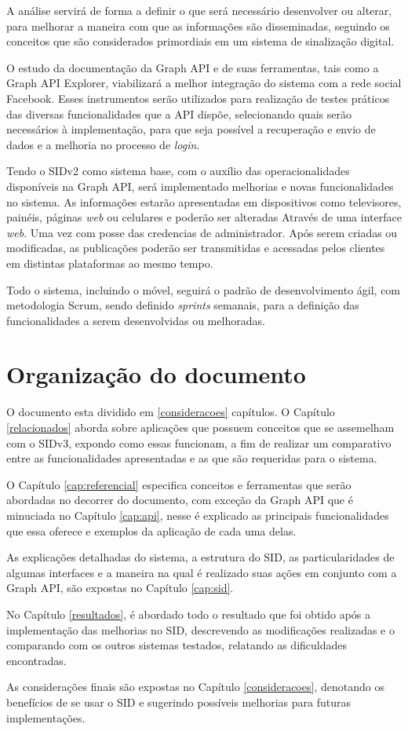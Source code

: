 A análise servirá de forma a definir o que será necessário desenvolver ou alterar, para melhorar a maneira com que as informações são disseminadas, seguindo os conceitos que são considerados primordiais em um sistema de sinalização digital.

O estudo da documentação da Graph API e de suas ferramentas, tais como a Graph API Explorer, viabilizará a melhor integração do sistema com a rede social Facebook. Esses instrumentos serão utilizados para realização de testes práticos das diversas funcionalidades que a API dispõe, selecionando quais serão necessários à implementação, para que seja possível a recuperação e envio de dados e a melhoria no processo de \textit{login}.
	 
Tendo o SIDv2 como sistema base, com o auxílio das operacionalidades disponíveis na Graph API, será implementado melhorias e novas funcionalidades no sistema. As informações estarão apresentadas em dispositivos como televisores, painéis, páginas \textit{web} ou celulares e poderão ser alteradas Através de uma interface \textit{web}. Uma vez com posse das credencias de administrador. Após serem criadas ou modificadas, as publicações poderão ser transmitidas e acessadas pelos clientes em distintas plataformas ao mesmo tempo.

Todo o sistema, incluindo o móvel, seguirá o padrão de desenvolvimento ágil, com metodologia Scrum, sendo definido \textit{sprints} semanais, para a definição das funcionalidades a serem desenvolvidas ou melhoradas. 

\section{Organização do documento}
O documento esta dividido em \ref{consideracoes} capítulos. O Capítulo \ref{relacionados} aborda sobre aplicações que possuem conceitos que se assemelham com o SIDv3, expondo como essas funcionam, a fim de realizar um comparativo entre as funcionalidades apresentadas e as que são requeridas para o sistema.

O Capítulo \ref{cap:referencial} especifica conceitos e ferramentas que serão abordadas no decorrer do documento, com exceção da Graph API que é minuciada no Capítulo \ref{cap:api}, nesse é explicado as principais funcionalidades que essa oferece e exemplos da aplicação de cada uma delas.

As explicações detalhadas do sistema, a estrutura do SID, as particularidades de algumas interfaces e a maneira na qual é realizado suas ações em conjunto com a Graph API, são expostas no Capítulo \ref{cap:sid}.

No Capítulo \ref{resultados}, é abordado todo o resultado que foi obtido após a implementação das melhorias no SID, descrevendo as modificações realizadas e o comparando com os outros sistemas testados, relatando as dificuldades encontradas.

As considerações finais são expostas no Capítulo \ref{consideracoes}, denotando os benefícios de se usar o SID e sugerindo possíveis melhorias para futuras implementações.